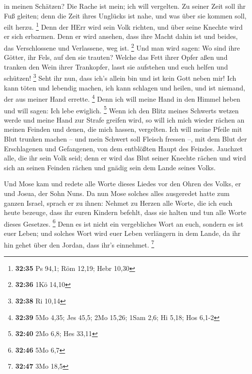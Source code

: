 in meinen Schätzen?  Die Rache ist mein; ich will
vergelten. Zu seiner Zeit soll ihr Fuß gleiten; denn die Zeit ihres
Unglücks ist nahe, und was über sie kommen soll, eilt herzu. \footnote{\textbf{32:35}
  Ps 94,1; Röm 12,19; Hebr 10,30}  Denn der HErr wird sein
Volk richten, und über seine Knechte wird er sich erbarmen. Denn er wird
ansehen, dass ihre Macht dahin ist und beides, das Verschlossene und
Verlassene, weg ist. \footnote{\textbf{32:36} 1Kö 14,10} 
Und man wird sagen: Wo sind ihre Götter, ihr Fels, auf den sie trauten?
 Welche das Fett ihrer Opfer aßen und tranken den Wein
ihrer Trankopfer, lasst sie aufstehen und euch helfen und schützen!
\footnote{\textbf{32:38} Ri 10,14}  Seht ihr nun, dass
ich's allein bin und ist kein Gott neben mir! Ich kann töten und
lebendig machen, ich kann schlagen und heilen, und ist niemand, der aus
meiner Hand errette. \footnote{\textbf{32:39} 5Mo 4,35; Jes 45,5; 2Mo
  15,26; 1Sam 2,6; Hi 5,18; Hos 6,1-2}  Denn ich will meine
Hand in den Himmel heben und will sagen: Ich lebe ewiglich. \footnote{\textbf{32:40}
  2Mo 6,8; Hes 33,11}  Wenn ich den Blitz meines Schwerts
wetzen werde und meine Hand zur Strafe greifen wird, so will ich mich
wieder rächen an meinen Feinden und denen, die mich hassen, vergelten.
 Ich will meine Pfeile mit Blut trunken machen -- und mein
Schwert soll Fleisch fressen --, mit dem Blut der Erschlagenen und
Gefangenen, von dem entblößten Haupt des Feindes.  Jauchzet
alle, die ihr sein Volk seid; denn er wird das Blut seiner Knechte
rächen und wird sich an seinen Feinden rächen und gnädig sein dem Lande
seines Volks.

 Und Mose kam und redete alle Worte dieses Liedes vor den
Ohren des Volks, er und Josua, der Sohn Nuns.  Da nun Mose
solches alles ausgeredet hatte zum ganzen Israel,  sprach
er zu ihnen: Nehmet zu Herzen alle Worte, die ich euch heute bezeuge,
dass ihr euren Kindern befehlt, dass sie halten und tun alle Worte
dieses Gesetzes. \footnote{\textbf{32:46} 5Mo 6,7}  Denn es
ist nicht ein vergebliches Wort an euch, sondern es ist euer Leben; und
solches Wort wird euer Leben verlängern in dem Lande, da ihr hin gehet
über den Jordan, dass ihr's einnehmet. \footnote{\textbf{32:47} 3Mo 18,5}

